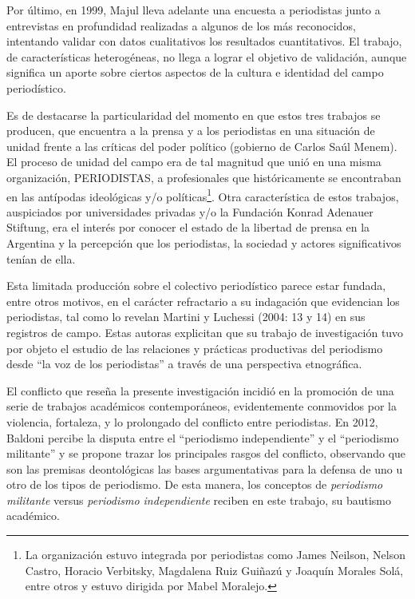 Por último, en 1999, Majul lleva adelante una encuesta a periodistas junto a entrevistas en profundidad realizadas a algunos de los más reconocidos, intentando validar con datos cualitativos los resultados cuantitativos. El trabajo, de características heterogéneas, no llega a lograr el objetivo de validación, aunque significa un aporte sobre ciertos aspectos de la cultura e identidad del campo periodístico.

Es de destacarse la particularidad del momento en que estos tres trabajos se producen, que encuentra a la prensa y a los periodistas en una situación de unidad frente a las críticas del poder político (gobierno de Carlos Saúl Menem). El proceso de unidad del campo era de tal magnitud que unió en una misma organización, PERIODISTAS, a profesionales que históricamente se encontraban en las antípodas ideológicas y/o políticas\footnote{La organización estuvo integrada por periodistas como James Neilson, Nelson Castro, Horacio Verbitsky, Magdalena Ruiz Guiñazú y Joaquín Morales Solá, entre otros y estuvo dirigida por Mabel Moralejo.}. Otra característica de estos trabajos, auspiciados por universidades privadas y/o la Fundación Konrad Adenauer Stiftung, era el interés por conocer el estado de la libertad de prensa en la Argentina y la percepción que los periodistas, la sociedad y actores significativos tenían de ella.

Esta limitada producción sobre el colectivo periodístico parece estar fundada, entre otros motivos, en el carácter refractario a su indagación que evidencian los periodistas, tal como lo revelan Martini y Luchessi (2004: 13 y 14) en sus registros de campo. Estas autoras explicitan que su trabajo de investigación tuvo por objeto el estudio de las relaciones y prácticas productivas del periodismo desde ``la voz de los periodistas'' a través de una perspectiva etnográfica.

El conflicto que reseña la presente investigación incidió en la promoción de una serie de trabajos académicos contemporáneos, evidentemente conmovidos por la violencia, fortaleza, y lo prolongado del conflicto entre periodistas. En 2012, Baldoni percibe la disputa entre el ``periodismo independiente'' y el ``periodismo militante'' y se propone trazar los principales rasgos del conflicto, observando que son las premisas deontológicas las bases argumentativas para la defensa de uno u otro de los tipos de periodismo. De esta manera, los conceptos de \emph{periodismo militante} versus \emph{periodismo independiente} reciben en este trabajo, su bautismo académico.

